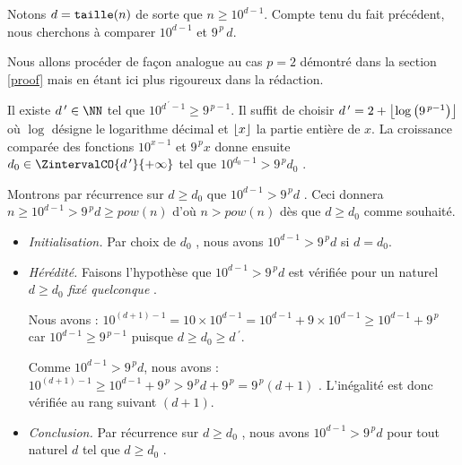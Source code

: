 \begin{proof*}\label{magicmajo-proof}
	Notons $d = \operatorname{\text{\normalfont\texttt{taille}}}(n)$ de sorte que $n \geqslant 10^{d-1}$.
	Compte tenu du fait précédent, nous cherchons à comparer $10^{d-1}$ et $9^{\,p} \, d$.
	
	
	\medskip
	
	Nous allons procéder de façon analogue au cas $p = 2$ démontré dans la section \ref{proof} mais en étant ici plus rigoureux dans la rédaction.
	
	
	\medskip
	
	Il existe $d\,^\prime \in \NN$ tel que $10^{d\,^\prime  - 1} \geqslant 9^{\,p  - 1}$.
	Il suffit de choisir $d\,^\prime = 2 + \left\lfloor  \log \left( 9^{\,p-1} \right)  \right\rfloor$ où $\log$ désigne le logarithme décimal et $\left\lfloor x \right\rfloor$ la partie entière de $x$.
	La croissance comparée des fonctions $10^{x - 1}$ et $9^{\,p} x$ donne ensuite $d_0 \in \ZintervalCO{d\,^\prime}{+\infty}$ tel que $10^{d_0 - 1} > 9^{\,p} d_0$ .



	\medskip
	
	Montrons par récurrence sur $d \geqslant d_0$ que $10^{d - 1} > 9^{\,p} d$ .
	Ceci donnera $n \geqslant 10^{d - 1} > 9^{\,p} d \geqslant pow(n)$ d'où $n > pow(n)$ dès que $d \geqslant d_0$ comme souhaité.

	\begin{itemize}[label=\small\textbullet]
		\item \emph{Initialisation.}
		Par choix de $d_0$ , nous avons $10^{d-1} > 9^{\,p} d$ si $d = d_0$.

		\item \emph{Hérédité.}
		Faisons l'hypothèse que $10^{d-1} > 9^{\,p} d$ est vérifiée pour un naturel $d \geqslant d_0$ \emph{\og fixé quelconque \fg}.

		\smallskip
		
		\noindent
		Nous avons : $10^{(d+1)-1} = 10\times10^{d-1} = 10^{d-1} + 9\times10^{d-1} \geqslant 10^{d-1} + 9^{\,p}$ car $10^{d-1} \geqslant 9^{\,p  - 1}$ puisque $d \geqslant d_0 \geqslant d\,^\prime$.

		\smallskip
		
		\noindent
		Comme $10^{d-1} > 9^{\,p} d$, nous avons : $10^{(d+1)-1} \geqslant 10^{d-1} + 9^{\,p} > 9^{\,p} d + 9^{\,p} = 9^{\,p} (d+ 1)$ .
		L'inégalité est donc vérifiée au rang suivant $(d+1)$. 

		\item \emph{Conclusion.}
		Par récurrence sur $d \geqslant d_0$ , nous avons $10^{d - 1} > 9^{\,p} d$ pour tout naturel $d$ tel que $d \geqslant d_0$ .
	\end{itemize}
\end{proof*}
	

